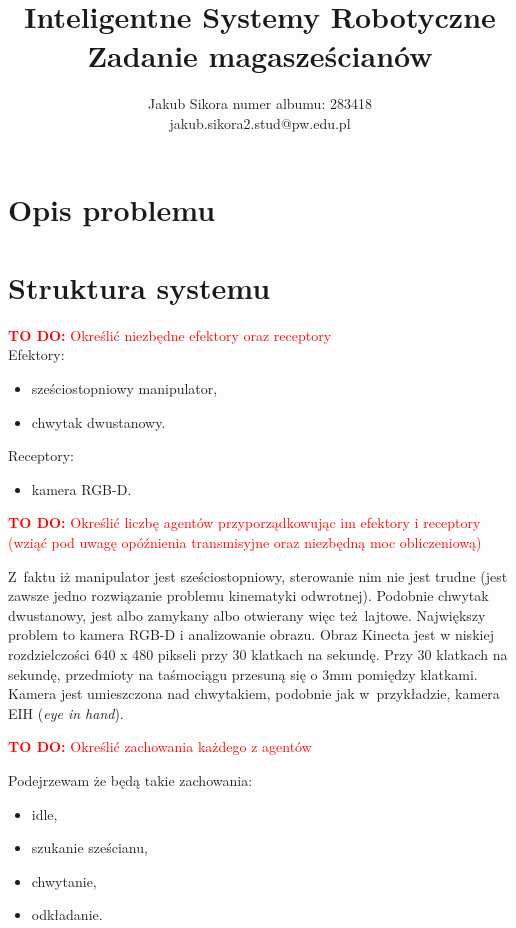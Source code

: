 \documentclass{article}
\title{Inteligentne Systemy Robotyczne \\ Zadanie magasześcianów}
\author{
Jakub Sikora
\affiliations
numer albumu: 283418 \\
\emails
jakub.sikora2.stud@pw.edu.pl
}
\newcommand{\todo}[1]{\textcolor{red}{\textbf{TO DO:} #1}}
\begin{document}
\maketitle

\section{Opis problemu}
\label{sec:opis-problemu}


\section{Struktura systemu}
\label{sec:struktura}


\todo{Określić niezbędne efektory oraz receptory} \\
Efektory: 
\begin{itemize}
    \item sześciostopniowy manipulator,
    \item chwytak dwustanowy.
\end{itemize}

Receptory:
\begin{itemize}
    \item kamera RGB-D.
\end{itemize}

\todo{Określić liczbę agentów przyporządkowując im efektory i
receptory (wziąć pod uwagę opóźnienia transmisyjne oraz
niezbędną moc obliczeniową)}

Z~faktu iż manipulator jest sześciostopniowy, sterowanie nim nie jest trudne (jest zawsze jedno rozwiązanie problemu kinematyki odwrotnej). Podobnie chwytak dwustanowy, jest albo zamykany albo otwierany więc też lajtowe. Największy problem to kamera RGB-D i analizowanie obrazu. Obraz Kinecta jest w niskiej rozdzielczości 640 x 480 pikseli przy 30 klatkach na sekundę. Przy 30 klatkach na sekundę, przedmioty na taśmociągu przesuną się o 3mm pomiędzy klatkami. Kamera jest umieszczona nad chwytakiem, podobnie jak w~przykładzie, kamera EIH (\emph{eye in hand}).

\todo{Określić zachowania każdego z agentów}

Podejrzewam że będą takie zachowania: 
\begin{itemize}
    \item idle,
    \item szukanie sześcianu,
    \item chwytanie,
    \item odkładanie.
\end{itemize}
\end{document}
